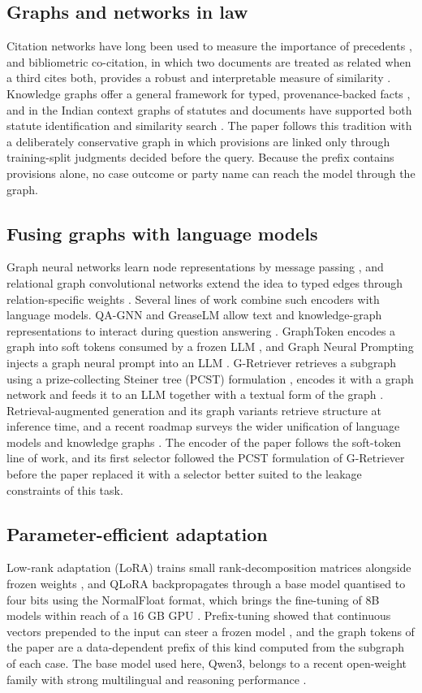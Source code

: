 \documentclass[journal]{IEEEtran}
\begin{document}
\subsection{Graphs and networks in law}
Citation networks have long been used to measure the importance of precedents \cite{r52}, and bibliometric co-citation, in which two documents are treated as related when a third cites both, provides a robust and interpretable measure of similarity \cite{r31}. Knowledge graphs offer a general framework for typed, provenance-backed facts \cite{r53}, and in the Indian context graphs of statutes and documents have supported both statute identification and similarity search \cite{r16,r17}. The paper follows this tradition with a deliberately conservative graph in which provisions are linked only through training-split judgments decided before the query. Because the prefix contains provisions alone, no case outcome or party name can reach the model through the graph.

\subsection{Fusing graphs with language models}
Graph neural networks learn node representations by message passing \cite{r54}, and relational graph convolutional networks extend the idea to typed edges through relation-specific weights \cite{r32}. Several lines of work combine such encoders with language models. QA-GNN and GreaseLM allow text and knowledge-graph representations to interact during question answering \cite{r19,r20}. GraphToken encodes a graph into soft tokens consumed by a frozen LLM \cite{r21}, and Graph Neural Prompting injects a graph neural prompt into an LLM \cite{r22}. G-Retriever retrieves a subgraph using a prize-collecting Steiner tree (PCST) formulation \cite{r55}, encodes it with a graph network and feeds it to an LLM together with a textual form of the graph \cite{r23}. Retrieval-augmented generation \cite{r56} and its graph variants \cite{r57} retrieve structure at inference time, and a recent roadmap surveys the wider unification of language models and knowledge graphs \cite{r58}. The encoder of the paper follows the soft-token line of work, and its first selector followed the PCST formulation of G-Retriever before the paper replaced it with a selector better suited to the leakage constraints of this task.

\subsection{Parameter-efficient adaptation}
Low-rank adaptation (LoRA) trains small rank-decomposition matrices alongside frozen weights \cite{r13}, and QLoRA backpropagates through a base model quantised to four bits using the NormalFloat format, which brings the fine-tuning of 8B models within reach of a 16 GB GPU \cite{r14}. Prefix-tuning showed that continuous vectors prepended to the input can steer a frozen model \cite{r33}, and the graph tokens of the paper are a data-dependent prefix of this kind computed from the subgraph of each case. The base model used here, Qwen3, belongs to a recent open-weight family with strong multilingual and reasoning performance \cite{r59}.
\end{document}
